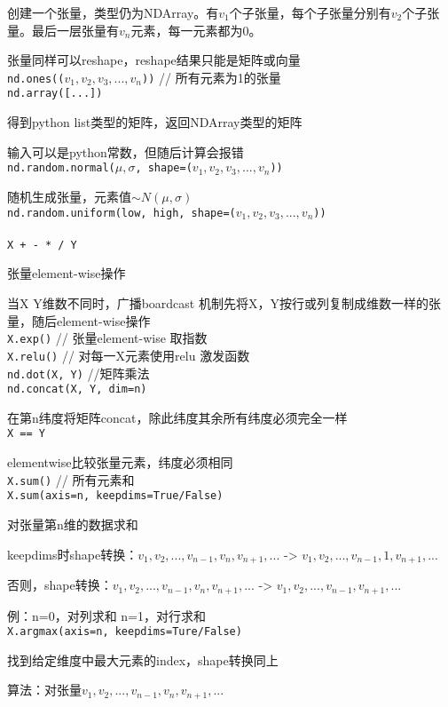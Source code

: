 \documentclass[UTF8]{ctexart}
\begin{document}
  创建一个张量，类型仍为NDArray。有$v_1$个子张量，每个子张量分别有$v_2$个子张量。最后一层张量有$v_n$元素，每一元素都为0。
  
  张量同样可以reshape，reshape结果只能是矩阵或向量\\
\texttt{nd.ones(($v_1, v_2, v_3, ..., v_n$))} // 所有元素为1的张量\\
\texttt{nd.array([...])}
 
  得到python list类型的矩阵，返回NDArray类型的矩阵
  
  输入可以是python常数，但随后计算会报错\\
\texttt{nd.random.normal($\mu, \sigma$, shape=($v_1, v_2, v_3, ..., v_n$))}


  随机生成张量，元素值$\sim N(\mu, \sigma)$\\
\texttt{nd.random.uniform(low, high, shape=($v_1, v_2, v_3, ..., v_n$))}\\\\
\texttt{X + - * / Y}

  张量element-wise操作
  
  当X Y维数不同时，广播boardcast 机制先将X，Y按行或列复制成维数一样的张量，随后element-wise操作\\
\texttt{X.exp()} // 张量element-wise 取指数\\
\texttt{X.relu()} // 对每一X元素使用relu 激发函数\\
\texttt{nd.dot(X, Y)} //矩阵乘法\\
\texttt{nd.concat(X, Y, dim=n)}

  在第n纬度将矩阵concat，除此纬度其余所有纬度必须完全一样\\
\texttt{X == Y} 

  elementwise比较张量元素，纬度必须相同\\
\texttt{X.sum()} // 所有元素和\\
\texttt{X.sum(axis=n, keepdims=True/False)}

  对张量第n维的数据求和
  
  keepdims时shape转换：$v_1, v_2, ..., v_{n-1}, v_n, v_{n+1}, ...$ -> $v_1, v_2, ..., v_{n-1}, 1, v_{n+1}, ...$

  否则，shape转换：$v_1, v_2, ..., v_{n-1}, v_n, v_{n+1}, ...$ -> $v_1, v_2, ..., v_{n-1}, v_{n+1}, ...$

  例：n=0，对列求和 n=1，对行求和\\
\texttt{X.argmax(axis=n, keepdims=Ture/False)}
  
  找到给定维度中最大元素的index，shape转换同上

  算法：对张量$v_1, v_2, ..., v_{n-1}, v_n, v_{n+1}, ...$
\end{document}
